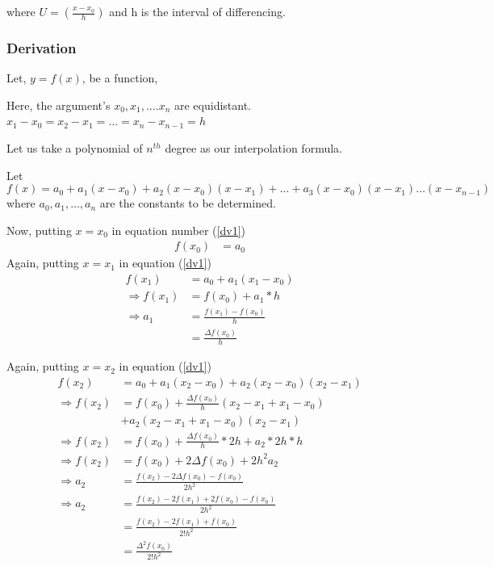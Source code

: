\documentclass[11pt, a4paper, oneside]{book}
\begin{document}
           where $U=(\frac{x-x_0}{h})$ and h is the interval of differencing.

           \subsubsection{Derivation}{{{
           Let, $y=f(x)$, be a function,

           Here, the argument's $x_0,x_1,\dots.x_n$ are equidistant. $x_1-x_0=x_2-x_1=\dots=x_n-x_{n-1}=h$

           Let us take a polynomial of $n^{th}$ degree as our interpolation formula.

           Let
           \begin{equation}\label{dv1}
             f(x)=a_0+a_1(x-x_0)+a_2(x-x_0)(x-x_1)+\dots+a_3(x-x_0)(x-x_1)\dots(x-x_{n-1})
           \end{equation}
           where $a_0,a_1,\dots,a_n$ are the constants to be determined.

           Now, putting $x=x_0$ in equation number (\ref{dv1})
           \begin{align*}
             f(x_0)&=a_0
           \end{align*}
           Again, putting $x=x_1$ in equation (\ref{dv1})
           \begin{align*}
             f(x_1)&=a_0+a_1(x_1-x_0)\\
             \Rightarrow f(x_1)&=f(x_0)+a_1*h\\
             \Rightarrow a_1 &=\frac{f(x_1)-f(x_0)}{h}\\
             &=\frac{\Delta f(x_0)}{h}
           \end{align*}

           Again, putting $x=x_2$ in equation (\ref{dv1})
           \begin{align*}
                         f(x_2)  &= a_0+a_1(x_2-x_0)+a_2(x_2-x_0)(x_2-x_1)\\
             \Rightarrow f(x_2)  &= f(x_0)+\frac{\Delta f(x_0)}{h}(x_2-x_1+x_1-x_0)\\ &+ a_2(x_2-x_1+x_1-x_0)(x_2-x_1)\\
             \Rightarrow f(x_2)  &= f(x_0)+\frac{\Delta f(x_0)}{h}*2h+a_2*2h*h\\
             \Rightarrow f(x_2)  &= f(x_0)+2\Delta f(x_0)+2h^2a_2\\
             \Rightarrow a_2     &= \frac{f(x_2)-2\Delta f(x_0)-f(x_0)}{2h^2}\\
             \Rightarrow a_2     &= \frac{f(x_2)-2f(x_1)+2f(x_0)-f(x_0)}{2h^2}\\
                                 &= \frac{f(x_2)-2f(x_1)+f(x_0)}{2!h^2}\\
                                 &= \frac{\Delta^2 f(x_0)}{2!h^2}
           \end{align*}

}}}
\end{document}
